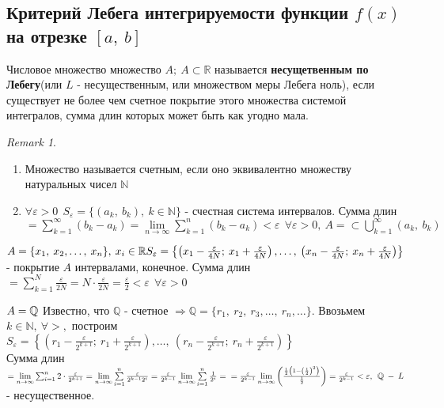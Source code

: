 \documentclass[a4paper,12pt]{bookest}
\theoremstyle{remark}
\newtheorem*{remark}{Remark}
\begin{document}
\subsection{Критерий Лебега интегрируемости функции $f(x)$ на отрезке $[a,\>b]$}
Числовое множество множество $A;\>A\subset\mathbb{R}$ называется \textbf{несущетвенным по Лебегу}(или $L$ - несущественным, или множеством меры Лебега ноль), если существует не более чем счетное покрытие этого множества системой интегралов, сумма длин которых может быть как угодно мала. 
\begin{remark}$ $
	\begin{enumerate}
		\item Множество называется счетным, если оно эквивалентно множеству натуральных чисел $\mathbb{N}$ 
		\item $\forall \varepsilon>0\>\>S_\varepsilon=\{(a_k,\>b_k),\>k\in\mathbb{N}\}$ - счестная система интервалов. Сумма длин $=\sum\limits_{k=1}^\infty(b_k-a_k)=\lim\limits_{n\to\infty}\sum\limits_{k=1}^n(b_k-a_k)<\varepsilon\>\>\forall\varepsilon>0,\>A=\subset\bigcup\limits_{k=1}^{\infty}(a_k,\>b_k)$
	\end{enumerate}
\end{remark}
\begin{example}
	$A=\{x_1,\>x_2,\dots,\>x_n\},\>x_i\in\mathbb{R}\\S_\varepsilon=\left\{\left(x_1-\frac{\varepsilon}{4N};\>x_1+\frac{\varepsilon}{4N}\right),\dots,\>\left(x_n-\frac{\varepsilon}{4N};\>x_n+\frac{\varepsilon}{4N}\right)\right\}$ - покрытие $A$ интервалами, конечное. Сумма длин $=\sum\limits_{k=1}^N\frac{\varepsilon}{2N}=N\cdot\frac\varepsilon{2N}=\frac\varepsilon2<\varepsilon\>\>\forall\varepsilon>0$
\end{example}
\begin{example}
	$A=\mathbb{Q}\\$ Известно, что $\mathbb{Q}$ - счетное $\Rightarrow\mathbb{Q}=\{r_1,\>r_2,\>r_3,\dots,\>r_n,\dots\}.$ Ввозьмем $k\in\mathbb{N},\>\forall>,$ построим $S_\varepsilon=\left\{\left(r_1-\frac\varepsilon{2^{k+1}};\>r_1+\frac\varepsilon{2^{k+1}}\right),\dots,\>\left(r_n-\frac\varepsilon{2^{k+1}};\>r_n+\frac\varepsilon{2^{k+1}}\right)\right\}$ \\ Сумма длин $=\lim\limits_{n\to\infty}\sum_{i=1}^n2\cdot\frac{\varepsilon}{2^{k+1}}=\lim\limits_{n\to\infty}\sum\limits_{i=1}^n\frac\varepsilon{2^{k-1}2^i}=\frac\varepsilon{2^{k-1}}\lim\limits_{n\to\infty}\sum\limits_{i=1}^n\frac1{2^i}=\\=\frac\varepsilon{2^{k-1}}\lim\limits_{n\to\infty}\left(\frac{\frac12\left(1-\left(\frac12\right)^2\right)}{\frac12}\right)=\frac\varepsilon{2^{k-1}}<\varepsilon,\>\>\mathbb{Q}\>-\>L$ - несущественное.
\end{example}
\end{document}
